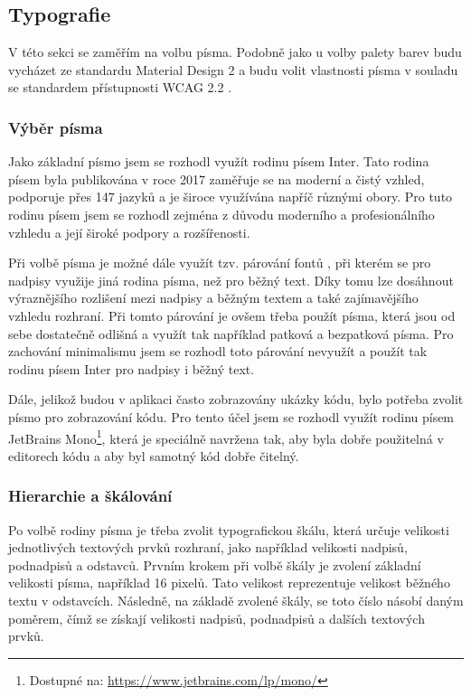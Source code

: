 \subsection{Typografie}

V této sekci se zaměřím na volbu písma. Podobně jako u volby palety barev budu vycházet ze standardu Material Design 2 a budu volit vlastnosti písma v souladu se standardem přístupnosti WCAG 2.2 \cite{WCAG22}.

\subsubsection{Výběr písma}

Jako základní písmo jsem se rozhodl využít rodinu písem Inter. Tato rodina písem byla publikována v roce 2017 zaměřuje se na moderní a čistý vzhled, podporuje přes 147 jazyků a je široce využívána napříč různými obory. Pro tuto rodinu písem jsem se rozhodl zejména z důvodu moderního a profesionálního vzhledu a její široké podpory a rozšířenosti. \cite{Inter}

Při volbě písma je možné dále využít tzv. párování fontů \cite[271-272]{Tidwell2020DesigningInterfaces}, při kterém se pro nadpisy využije jiná rodina písma, než pro běžný text. Díky tomu lze dosáhnout výraznějšího rozlišení mezi nadpisy a běžným textem a také zajímavějšího vzhledu rozhraní. Při tomto párování je ovšem třeba použít písma, která jsou od sebe dostatečně odlišná a využít tak například patková a bezpatková písma. Pro zachování minimalismu jsem se rozhodl toto párování nevyužít a použít tak rodinu písem Inter pro nadpisy i běžný text.

Dále, jelikož budou v aplikaci často zobrazovány ukázky kódu, bylo potřeba zvolit písmo pro zobrazování kódu. Pro tento účel jsem se rozhodl využít rodinu písem JetBrains Mono\footnote{Dostupné na: \href{https://www.jetbrains.com/lp/mono/}{https://www.jetbrains.com/lp/mono/}}, která je speciálně navržena tak, aby byla dobře použitelná v editorech kódu a aby byl samotný kód dobře čitelný. \cite{JetBrainsMono}

\subsubsection{Hierarchie a škálování}

Po volbě rodiny písma je třeba zvolit typografickou škálu, která určuje velikosti jednotlivých textových prvků rozhraní, jako například velikosti nadpisů, podnadpisů a odstavců. Prvním krokem při volbě škály je zvolení základní velikosti písma, například 16 pixelů. Tato velikost reprezentuje velikost běžného textu v odstavcích. Následně, na základě zvolené škály, se toto číslo násobí daným poměrem, čímž se získají velikosti nadpisů, podnadpisů a dalších textových prvků. 

